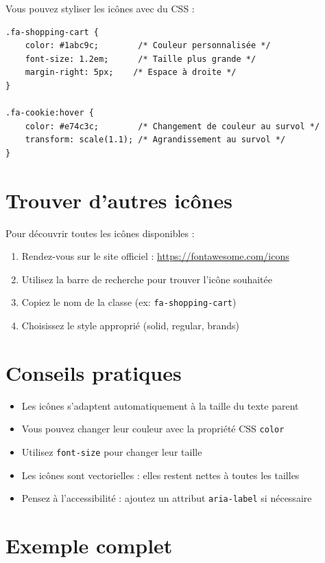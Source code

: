 \documentclass[12pt,a4paper]{article}
\begin{document}
Vous pouvez styliser les icônes avec du CSS :

\begin{lstlisting}
.fa-shopping-cart {
    color: #1abc9c;        /* Couleur personnalisée */
    font-size: 1.2em;      /* Taille plus grande */
    margin-right: 5px;    /* Espace à droite */
}

.fa-cookie:hover {
    color: #e74c3c;        /* Changement de couleur au survol */
    transform: scale(1.1); /* Agrandissement au survol */
}
\end{lstlisting}

\section{Trouver d'autres icônes}

Pour découvrir toutes les icônes disponibles :

\begin{enumerate}
\item Rendez-vous sur le site officiel : \url{https://fontawesome.com/icons}
\item Utilisez la barre de recherche pour trouver l'icône souhaitée
\item Copiez le nom de la classe (ex: \texttt{fa-shopping-cart})
\item Choisissez le style approprié (solid, regular, brands)
\end{enumerate}

\section{Conseils pratiques}

\begin{itemize}
\item Les icônes s'adaptent automatiquement à la taille du texte parent
\item Vous pouvez changer leur couleur avec la propriété CSS \texttt{color}
\item Utilisez \texttt{font-size} pour changer leur taille
\item Les icônes sont vectorielles : elles restent nettes à toutes les tailles
\item Pensez à l'accessibilité : ajoutez un attribut \texttt{aria-label} si nécessaire
\end{itemize}

\section{Exemple complet}
\end{document}
